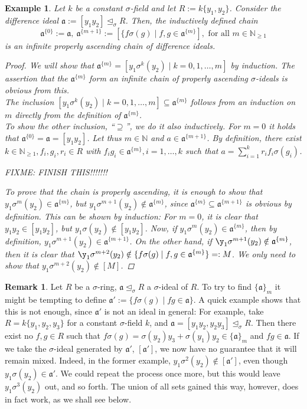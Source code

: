 \documentclass{article}
\def\NE{\mathbb{N}_{\geq1}}
\def\N{\mathbb{N}}
\def\a{\mathfrak{a}}
\def\s{\sigma}
\def\si{\unlhd_{\sigma}}
\def\fa{\text{ for all }}
\newenvironment{bew}{\begin{proof}[Proof]}{\end{proof}}
\theoremstyle{plain}
\newtheorem{ex}[Satz]{Example}
\theoremstyle{definition}
\newtheorem{rem}[Satz]{Remark}
\begin{document}
\begin{ex}\label{nombasisex}
Let $k$ be a constant $\s$-field and let $R:= k\{y_1,y_2\}$. Consider the difference ideal $\a:= [y_1y_2] \si R$. Then, the inductively defined chain $$\a^{\{0\}}:= \a,~ \a^{\{m+1\}}:= [\{ f \s(g) \mid f,g \in \a^{\{m\}}], \fa m \in \NE$$
is an infinite properly ascending chain of difference ideals.
\begin{bew}
We will show that $\a^{\{m\}} = [y_1\s^k(y_2) \mid k = 0,1,\ldots,m]$ by induction. The assertion that the $\a^{\{m\}}$ form an infinite chain of properly ascending $\s$-ideals is obvious from this.\\
\indent The inclusion $ [y_1\s^k(y_2) \mid k = 0,1,\ldots,m] \subseteq \a^{\{m\}}$ follows from an induction on $m$ directly from the definition of $\a^{\{m\}}$. \\ 
\indent  To show the other inclusion, ``$\supseteq$'', we do it also inductively. For $m=0$ it holds that $\a^{\{0\}} = \a = [y_1y_2]$. Let thus $m \in \N$ and $a \in \a^{\{m+1\}}$.
By definition, there exist $k \in \NE, f_i, g_i, r_i \in R$ with $f_ig_i \in \a^{\{m\}}, i = 1,\ldots,k$ such that $a = \sum_{i=1}^k r_i f_i \s(g_i)$. 

FIXME: FINISH THIS!!!!!!!

 To prove that the chain is properly ascending, it is enough to show that $y_1\s^m(y_2) \in \a^{\{m\}}$, but $y_1\s^{m+1}(y_2) \notin \a^{\{m\}}$, since $\a^{\{m\}} \subseteq \a^{\{m+1\}}$ is obvious by definition.
This can be shown by induction: For $m = 0$, it is clear that $y_1y_2 \in [y_1y_2]$, but $y_1 \s(y_2) \notin [y_1y_2]$. Now, if $y_1 \s^m(y_2) \in \a^{\{m\}}$, then by definition, $y_1 \s^{m+1}(y_2) \in \a^{\{m+1\}}$.
On the other hand, if $\y_1 \s^{m+1}(y_2) \notin \a^{\{m\}}$, then it is clear that $\y_1 \s^{m+2}(y_2) \notin \{ f\s(g) \mid f,g \in \a^{\{m\}}\} =: M$. We only need to show that $y_1\s^{m+2}(y_2) \notin [M]$.

\end{bew}
\end{ex}


\begin{rem}\label{remshuffling}
Let $R$ be a $\s$-ring, $\a \si R$ a $\s$-ideal of $R$. To try to find $\{\a\}_m$ it might be tempting to define $\a':= \{ f\s(g) \mid fg \in \a \}$. A quick example shows that this is not enough, since $\a'$ is not an ideal in general: 
For example, take $R=k\{y_1,y_2,y_3\}$ for a constant $\s$-field $k$, and $\a = [y_1y_2, y_2y_3] \si R$. Then there exist no $f,g \in R$ such that $ f \s(g) = \s(y_2)y_3 + \s(y_1)y_2 \in \{\a\}_m$ and $fg \in \a$. 
If we take the $\s$-ideal generated by $\a'$, $[\a']$, we now have no guarantee that it will remain mixed. Indeed, in the former example, $y_1\s^2(y_2) \notin [\a']$, even though $y_1 \s(y_2) \in \a'$. We could repeat the process once more,
 but this would leave $y_1 \s^3(y_2)$ out, and so forth. The union of all sets gained this way, however, does in fact work, as we shall see below.
\end{rem}
\end{document}
